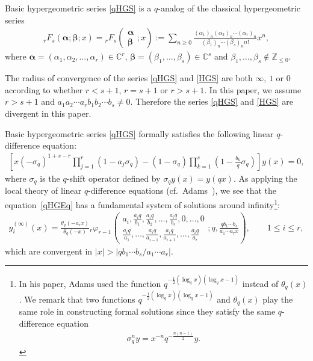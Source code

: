 \documentclass[pdftex]{sigma}
\numberwithin{equation}{section}
\begin{document}
Basic hypergeometric series \eqref{qHGS} is a $q$-analog of the classical hypergeometric series
\begin{gather}\label{HGS}
{}_rF_s\left(\bm{\alpha};\bm{\beta};x\right)=
{}_rF_s\left(\begin{matrix}
\bm{\alpha}\\
\bm{\beta}
\end{matrix};x\right)
:=\sum_{n\ge0}\frac{(\alpha_1)_n(\alpha_2)_n\cdots(\alpha_r)_n}{(\beta_1)_n\cdots(\beta_s)_nn!}x^n,
\end{gather}
where $\bm{\alpha}=(\alpha_1,\alpha_2,\ldots,\alpha_r)\in\mathbb{C}^r$, $\bm{\beta}=(\beta_1,\ldots,\beta_s)\in\mathbb{C}^s$ and $\beta_1,\ldots,\beta_s\notin \mathbb{Z}_{\le0}$.

The radius of convergence of the series \eqref{qHGS} and \eqref{HGS} are both $\infty$, $1$ or $0$ according to whether $r<s+1$, $r=s+1$ or $r>s+1$. In this paper, we assume $r>s+1$ and $a_1a_2\cdots a_rb_1b_2\cdots b_s\neq0$. Therefore the series \eqref{qHGS} and \eqref{HGS} are divergent in this paper.

Basic hypergeometric series \eqref{qHGS} formally satisfies the following linear $q$-difference equation:
\begin{gather}\label{qHGEq}
\left[x(-\sigma_q)^{1+s-r}\prod_{j=1}^r(1-a_j\sigma_q)-(1-\sigma_q)\prod_{k=1}^s\left(1-\frac{b_k}{q}\sigma_q\right)\right]y(x)=0,
\end{gather}
where $\sigma_q$ is the $q$-shift operator defined by $\sigma_qy(x)=y(qx)$. As applying the local theory of linear $q$-difference equations (cf.\ Adams~\cite{Adams1929}), we see that the equation~\eqref{qHGEq} has a fundamental system of solutions around infinity\footnote{In his paper, Adams used the function $q^{-\frac{1}{2}(\log_q x)(\log_q x-1)}$ instead of $\theta_q(x)$. We remark that two functions $q^{-\frac{1}{2}(\log_q x)(\log_q x-1)}$ and $\theta_q(x)$ play the same role in constructing formal solutions since they satisfy the same $q$-difference equation
\begin{gather*}
\sigma_q^n y=x^{-n}q^{-\frac{n(n-1)}{2}}y.
\end{gather*}}:
\begin{gather}\label{qHGEq_Sol}
y_i^{(\infty)}(x)=\frac{\theta_q(-a_ix)}{\theta_q(-x)}{}_{r}\varphi_{r-1}
\left(\begin{matrix}
a_i,\frac{a_iq}{b_1},\frac{a_iq}{b_2},\ldots,\frac{a_iq}{b_s},0,\ldots,0\\
\frac{a_iq}{a_1},\ldots,\frac{a_iq}{a_{i-1}},\frac{a_iq}{a_{i+1}},\ldots,\frac{a_iq}{a_r}
\end{matrix};q,\frac{qb_1\cdots b_s}{a_1\cdots a_rx}\right),\qquad\!\! 1\le i\le r,\!\!\!
\end{gather}
which are convergent in $\vert x\vert>\vert qb_1\cdots b_s/a_1\cdots a_r\vert$.
\end{document}
